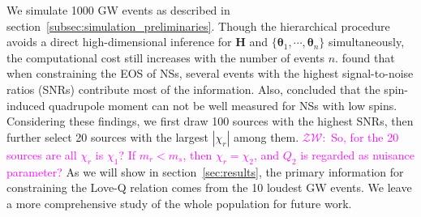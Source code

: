 \documentclass[a4paper,11pt]{article}
\newcommand{\ZW}[1]{\textcolor{magenta}{$\mathcal{ZW}$:~#1}}
\begin{document}
We simulate 1000 GW events as 
described in section~\ref{subsec:simulation_preliminaries}. 
Though the hierarchical procedure avoids a direct high-dimensional inference for
$\bm{H}$ and $\{\bm{\theta}_1,\cdots,\bm{\theta}_n\}$ simultaneously, the
computational cost still increases with the number of events $n$.
\citet{Lackey:2014fwa} found that when constraining the EOS of NSs, several events
with the highest signal-to-noise ratios (SNRs)
 contribute most of the information. Also,
\citet{Yagi:2013awa} concluded that the spin-induced quadrupole moment can not
be well measured for NSs with low spins. Considering these findings, we first
draw 100 sources with the highest SNRs, then further select 20 sources with the
largest $|\chi_{r}|$ among them. \ZW{So, for the 20 sources are all $\chi_{r}$
is $\chi_{1}$? If $m_r<m_s$, then $\chi_{r}=\chi_{2}$, and $Q_2$ is regarded as
nuisance parameter?} As we will show in section~\ref{sec:results}, the primary
information for constraining the Love-Q relation comes from the 10 loudest GW
events. We leave a more comprehensive study of the whole population for future
work. 
\end{document}
